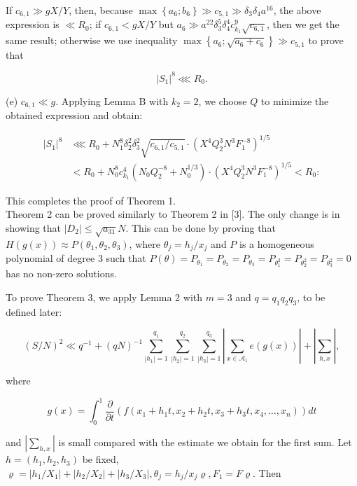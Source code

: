 \documentclass[10pt]{article}
\begin{document}
If $c_{6,1} \gg g X / Y$, then, because $\max \left\{a_{6} ; b_{6}\right\} \gg c_{5,1} \gg \delta_{3} \delta_{4} a^{16}$, the above expression is $\ll R_{0}$; if $c_{6,1}<g X / Y$ but $a_{6} \gg a^{22} \delta_{3}^{5} \delta_{4}^{4} c_{k_{1}}^{9} \sqrt{c_{6,1}}$, then we get the same result; otherwise we use inequality $\max \left\{a_{6} ; \sqrt{a_{6}+c_{6}}\right\} \gg c_{5,1}$ to prove that

$$
\left|S_{1}\right|^{8} \lll R_{0} .
$$

(e) $c_{6,1} \ll g$. Applying Lemma B with $k_{2}=2$, we choose $Q$ to minimize the obtained expression and obtain:

$$
\begin{aligned}
\left|S_{1}\right|^{8} & \lll R_{0}+N_{1}^{8} \delta_{2}^{2} \delta_{3}^{2} \sqrt{c_{6,1} / c_{5,1}} \cdot\left(X^{4} Q_{2}^{3} N^{3} F_{1}^{-8}\right)^{1 / 5} \\
& <R_{0}+N_{0}^{8} c_{k_{1}}^{4}\left(N_{0} Q_{2}^{-8}+N_{0}^{1 / 3}\right) \cdot\left(X^{4} Q_{2}^{3} N^{3} F_{1}^{-8}\right)^{1 / 5}<R_{0}:
\end{aligned}
$$

This completes the proof of Theorem 1.\\[0pt]
Theorem 2 can be proved similarly to Theorem 2 in [3]. The only change is in showing that $\left|D_{2}\right| \leqslant \sqrt{a_{31}} N$. This can be done by proving that $H(g(x)) \approx P\left(\theta_{1}, \theta_{2}, \theta_{3}\right)$, where $\theta_{j}=h_{j} / x_{j}$ and $P$ is a homogeneous polynomial of degree 3 such that $P(\theta)=P_{\theta_{1}}=P_{\theta_{2}}=P_{\theta_{3}}=P_{\theta_{1}^{2}}=P_{\theta_{2}^{2}}=P_{\theta_{3}^{2}}=0$ has no non-zero solutions.

To prove Theorem 3, we apply Lemma 2 with $m=3$ and $q=q_{1} q_{2} q_{3}$, to be defined later:


\begin{equation*}
(S / N)^{2} \ll q^{-1}+(q N)^{-1} \sum_{\left|h_{1}\right|=1}^{q_{1}} \sum_{\left|h_{2}\right|=1}^{q_{2}} \sum_{\left|h_{3}\right|=1}^{q_{3}}\left|\sum_{x \in \mathscr{A}_{1}} e(g(x))\right|+\left|\sum_{h, x}\right|, \tag{12}
\end{equation*}


where

$$
g(x)=\int_{0}^{1} \frac{\partial}{\partial t}\left(f\left(x_{1}+h_{1} t, x_{2}+h_{2} t, x_{3}+h_{3} t, x_{4}, \ldots, x_{n}\right)\right) d t
$$

and $\left|\sum_{h, x}\right|$ is small compared with the estimate we obtain for the first sum. Let $h=\left(h_{1}, h_{2}, h_{3}\right)$ be fixed, $\varrho=\left|h_{1} / X_{1}\right|+\left|h_{2} / X_{2}\right|+\left|h_{3} / X_{3}\right|, \theta_{j}=h_{j} / x_{j} \varrho, F_{1}=F \varrho$. Then
\end{document}
